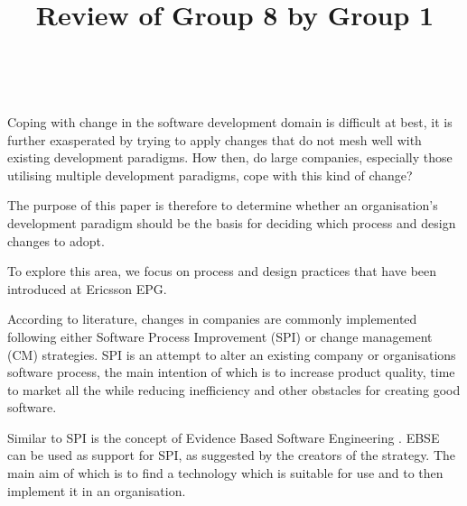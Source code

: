 \documentclass[times, 10pt,twocolumn]{IEEEtran}
\begin{document}
\title{Review of Group 8 by Group 1}

\author{


}


\maketitle
\thispagestyle{empty}



​

Coping with change in the software development domain is difficult at best, it is further exasperated by trying to apply changes that do not mesh well with existing development paradigms. How then, do large companies, especially those utilising multiple development paradigms, cope with this kind of change?

The purpose of this paper is therefore to determine whether an organisation's development paradigm should be the basis for deciding which process and design changes to adopt. 

To explore this area, we focus on process and design practices that have been introduced at Ericsson EPG.


According to literature, changes in companies are commonly implemented following either Software Process Improvement (SPI)\cite{pettersson2008practitioner}\cite{unterkalmsteiner2012evaluation} or change management (CM) strategies. SPI is an attempt to alter an existing company or organisations software process, the main intention of which is to increase product quality, time to market all the while reducing inefficiency and other obstacles for creating good software. 

Similar to SPI is the concept of Evidence Based Software Engineering \cite{dyba2005evidence}. EBSE can be used as support for SPI, as suggested by the creators of the strategy. The main aim of which is to find a technology which is suitable for use and to then implement it in an organisation.
\end{document}
